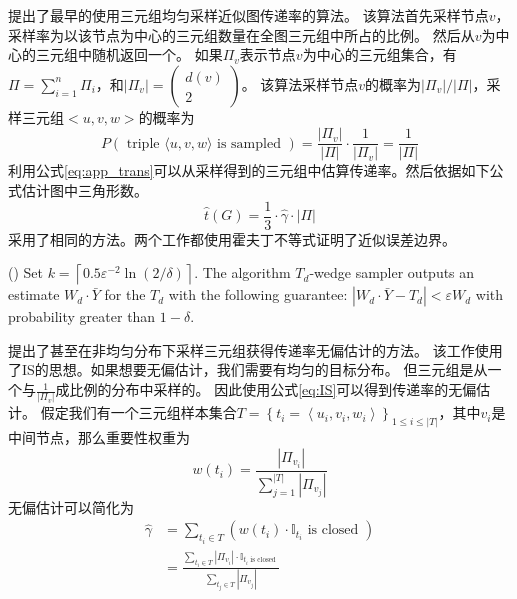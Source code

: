 \cite{schank2005approximating}提出了最早的使用三元组均匀采样近似图传递率的算法。
该算法首先采样节点$v$，采样率为以该节点为中心的三元组数量在全图三元组中所占的比例。
然后从$v$为中心的三元组中随机返回一个。
如果$\Pi_{v}$表示节点$v$为中心的三元组集合，有
$\Pi=\sum_{i=1}^{n} \Pi_{i}$，和$\left|\Pi_{v}\right|=\left(\begin{array}{c}d(v) \\2\end{array}\right)$。
该算法采样节点$v$的概率为$|\Pi_{v}|/|\Pi|$，采样三元组$<u,v,w>$的概率为
\begin{equation}
    P(\text { triple }\langle u, v, w\rangle \text { is sampled })=\frac{\left|\Pi_{v}\right|}{|\Pi|} \cdot \frac{1}{|\Pi_{v}|}=\frac{1}{|\Pi|} 
\end{equation}
利用公式\ref{eq:app_trans}可以从采样得到的三元组中估算传递率。然后依据如下公式估计图中三角形数。
\begin{equation}
    \hat{t}(G)=\frac{1}{3} \cdot \hat{\gamma} \cdot|\Pi|
\end{equation}
\cite{seshadhri2013triadic}采用了相同的方法。两个工作都使用霍夫丁不等式证明了近似误差边界。
\begin{theorem}
    (\cite{seshadhri2013triadic}) Set $k=\left\lceil 0.5 \varepsilon^{-2} \ln (2 / \delta)\right\rceil$. The algorithm $T_{d}$-wedge sampler outputs an estimate $W_{d} \cdot \bar{Y}$ for
    the $T_{d}$ with the following guarantee: $\left|W_{d} \cdot \bar{Y}-T_{d}\right|<\varepsilon W_{d}$
    with probability greater than $1 - \delta$.
\end{theorem}

\cite{al2016methods}提出了甚至在非均匀分布下采样三元组获得传递率无偏估计的方法。
该工作使用了IS的思想。如果想要无偏估计，我们需要有均匀的目标分布。
但三元组是从一个与$\frac{1}{|\Pi_{v}|}$成比例的分布中采样的。
因此使用公式\ref{eq:IS}可以得到传递率的无偏估计。
假定我们有一个三元组样本集合$T=\left\{t_{i}=\left\langle u_{i}, v_{i}, w_{i}\right\rangle\right\}_{1 \leq i \leq|T|}$，其中$v_{i}$是中间节点，那么重要性权重为
\begin{equation}
    w\left(t_{i}\right)=\frac{\left|\Pi_{v_{i}}\right|}{\sum_{j=1}^{|T|}\left|\Pi_{v_{j}}\right|}
\end{equation}
无偏估计可以简化为
\begin{equation}
    \begin{aligned}
        \hat{\gamma} &=\sum_{t_{i} \in T}\left(w\left(t_{i}\right) \cdot \mathbb{I}_{t_{i}} \text { is closed }\right) \\
        &=\frac{\sum_{t_{i} \in T}\left|\Pi_{v_{i}}\right| \cdot \mathbb{I}_{t_{i} \text { is closed }}}{\sum_{t_{j} \in T}\left|\Pi_{v_{j}}\right|}
        \end{aligned}
\end{equation}


